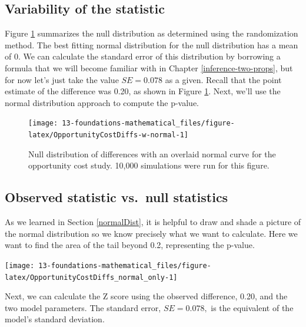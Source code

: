 \documentclass[
  10pt,
  openany]{book}
\begin{document}
\hypertarget{variability-of-the-statistic-4}{%
\subsection{Variability of the statistic}\label{variability-of-the-statistic-4}}

Figure \ref{fig:OpportunityCostDiffs-w-normal} summarizes the null distribution as determined using the randomization method.
The best fitting normal distribution for the null distribution has a mean of 0.
We can calculate the standard error of this distribution by borrowing a formula that we will become familiar with in Chapter \ref{inference-two-props}, but for now let's just take the value \(SE = 0.078\) as a given.
Recall that the point estimate of the difference was 0.20, as shown in Figure \ref{fig:OpportunityCostDiffs-w-normal}.
Next, we'll use the normal distribution approach to compute the p-value.

\begin{figure}[h]

{\centering \texttt{[image: 13-foundations-mathematical\_files/figure-latex/OpportunityCostDiffs-w-normal-1]} 

}

\caption{Null distribution of differences with an overlaid normal curve for the opportunity cost study. 10,000 simulations were run for this figure.}\label{fig:OpportunityCostDiffs-w-normal}
\end{figure}

\hypertarget{observed-statistic-vs.-null-statistics-2}{%
\subsection{Observed statistic vs.~null statistics}\label{observed-statistic-vs.-null-statistics-2}}

As we learned in Section \ref{normalDist}, it is helpful to draw and shade a picture of the normal distribution so we know precisely what we want to calculate.
Here we want to find the area of the tail beyond 0.2, representing the p-value.

\begin{center}\texttt{[image: 13-foundations-mathematical\_files/figure-latex/OpportunityCostDiffs\_normal\_only-1]} \end{center}

Next, we can calculate the Z score using the observed difference, 0.20, and the two model parameters.
The standard error, \(SE = 0.078,\) is the equivalent of the model's standard deviation.
\end{document}
